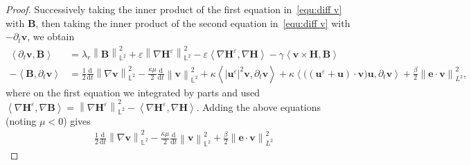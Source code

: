 \documentclass[10pt,a4paper]{amsart}
\newcommand{\abs}[1]{\left|{#1}\right|}
\newcommand{\bb}{\mathbb}
\newcommand{\bff}{\boldsymbol}
\newcommand{\ddt}{\frac{\mathrm{d}}{\mathrm{d}t}}
\newcommand{\ds}{\mathrm{d}s}
\newcommand{\inpro}[2]{\left\langle#1,#2\right\rangle}
\newcommand{\norm}[2]{\left\|{#1}\right\|_{#2}}
\begin{document}
\begin{proof}
Successively taking the inner product of the first equation in~\eqref{equ:diff v} with $\bff{B}$, then taking the inner product of the second equation in~\eqref{equ:diff v} with $-\partial_t \bff{v}$, we obtain
\begin{align*}
	\inpro{\partial_t \bff{v}}{\bff{B}}
	&=
	\lambda_r \norm{\bff{B}}{\bb{L}^2}^2
	+
	\varepsilon \norm{\nabla \bff{H}^\varepsilon}{\bb{L}^2}^2
	-
	\varepsilon \inpro{\nabla \bff{H}^\varepsilon}{\nabla \bff{H}}
	-
	\gamma \inpro{\bff{v}\times \bff{H}}{\bff{B}}
	\\
	-\inpro{\bff{B}}{\partial_t \bff{v}}
	&=
	\frac12 \ddt \norm{\nabla \bff{v}}{\bb{L}^2}^2
	-
	\frac{\kappa \mu}{2} \ddt \norm{\bff{v}}{\bb{L}^2}^2
	+
	\kappa \inpro{|\bff{u}^\varepsilon|^2 \bff{v}}{\partial_t \bff{v}}
	+
	\kappa \inpro{\big( (\bff{u}^\varepsilon+\bff{u})\cdot \bff{v} \big) \bff{u}}{\partial_t \bff{v}}
	+
	\frac{\beta}{2} \norm{\bff{e}\cdot \bff{v}}{L^2}^2,
\end{align*}
where on the first equation we integrated by parts and used $\inpro{\nabla \bff{H}^\varepsilon}{\nabla \bff{B}}= \norm{\nabla \bff{H}^\varepsilon}{\bb{L}^2}^2 - \inpro{\nabla \bff{H}^\varepsilon}{\nabla \bff{H}}$.
Adding the above equations (noting $\mu<0$) gives
\begin{align}\label{equ:add dtv B}
	&\frac12 \ddt \norm{\nabla \bff{v}}{\bb{L}^2}^2
	-
	\frac{\kappa\mu}{2} \ddt \norm{\bff{v}}{\bb{L}^2}^2
	+
	\frac{\beta}{2} \norm{\bff{e}\cdot \bff{v}}{L^2}^2

\end{align}
\end{proof}
\end{document}
